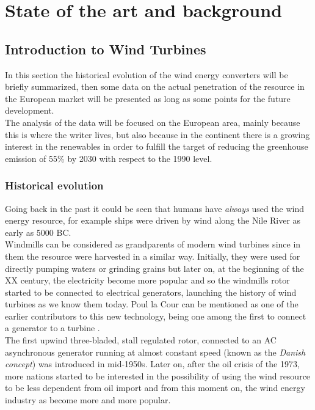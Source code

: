 \newpage
\section{State of the art and background}\label{sec:c_state_of_the_art}
\subsection{Introduction to Wind Turbines}\label{subsec:c_WT_characteristics}
In this section the historical evolution of the wind energy converters will be briefly summarized, then some data on the actual penetration of the resource in the European market will be presented as long as some points for the future development. \\
The analysis of the data will be focused on the European area, mainly because this is where the writer lives, but also because in the continent there is a growing interest in the renewables in order to fulfill the target of reducing the greenhouse emission of 55\% by 2030 with respect to the 1990 level. 

\subsubsection{Historical evolution}
Going back in the past it could be seen that humans have \textit{always} used the wind energy resource, for example ships were driven by wind along the Nile River as early as 5000 BC.\\
Windmills can be considered as grandparents of modern wind turbines since in them the resource were harvested in a similar way. Initially, they were used for directly pumping waters or grinding grains but later on, at the beginning of the XX century, the electricity become more popular and so the windmills rotor started to be connected to electrical generators, launching the history of wind turbines as we know them today. Poul la Cour can be mentioned as one of the earlier contributors to this new technology, being one among the first to connect a generator to a turbine \cite{Aerodynamics_of_wind_turbines}. \\
The first upwind three-bladed, stall regulated rotor, connected to an AC asynchronous generator running at almost constant speed (known as the \textit{Danish concept}) was introduced in mid-1950s. Later on, after the oil crisis of the 1973, more nations started to be interested in the possibility of using the wind resource to be less dependent from oil import and from this moment on, the wind energy industry as become more and more popular. 

